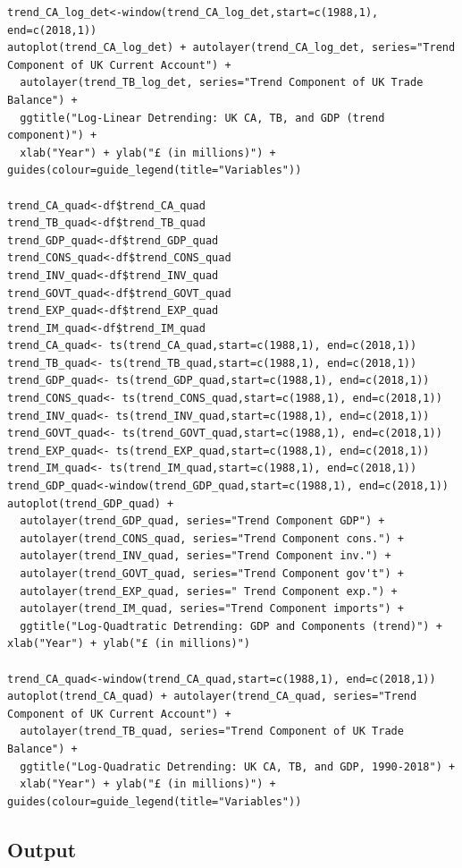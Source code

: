 \documentclass[12pt]{article}
\begin{document}
\begin{verbatim}
trend_CA_log_det<-window(trend_CA_log_det,start=c(1988,1), end=c(2018,1)) 
autoplot(trend_CA_log_det) + autolayer(trend_CA_log_det, series="Trend Component of UK Current Account") +
  autolayer(trend_TB_log_det, series="Trend Component of UK Trade Balance") +
  ggtitle("Log-Linear Detrending: UK CA, TB, and GDP (trend component)") + 
  xlab("Year") + ylab("£ (in millions)") + guides(colour=guide_legend(title="Variables"))

trend_CA_quad<-df$trend_CA_quad
trend_TB_quad<-df$trend_TB_quad
trend_GDP_quad<-df$trend_GDP_quad
trend_CONS_quad<-df$trend_CONS_quad
trend_INV_quad<-df$trend_INV_quad
trend_GOVT_quad<-df$trend_GOVT_quad
trend_EXP_quad<-df$trend_EXP_quad	
trend_IM_quad<-df$trend_IM_quad
trend_CA_quad<- ts(trend_CA_quad,start=c(1988,1), end=c(2018,1))
trend_TB_quad<- ts(trend_TB_quad,start=c(1988,1), end=c(2018,1))
trend_GDP_quad<- ts(trend_GDP_quad,start=c(1988,1), end=c(2018,1))
trend_CONS_quad<- ts(trend_CONS_quad,start=c(1988,1), end=c(2018,1))
trend_INV_quad<- ts(trend_INV_quad,start=c(1988,1), end=c(2018,1))
trend_GOVT_quad<- ts(trend_GOVT_quad,start=c(1988,1), end=c(2018,1))
trend_EXP_quad<- ts(trend_EXP_quad,start=c(1988,1), end=c(2018,1))
trend_IM_quad<- ts(trend_IM_quad,start=c(1988,1), end=c(2018,1))
trend_GDP_quad<-window(trend_GDP_quad,start=c(1988,1), end=c(2018,1)) 
autoplot(trend_GDP_quad) +
  autolayer(trend_GDP_quad, series="Trend Component GDP") +
  autolayer(trend_CONS_quad, series="Trend Component cons.") +
  autolayer(trend_INV_quad, series="Trend Component inv.") +
  autolayer(trend_GOVT_quad, series="Trend Component gov't") +
  autolayer(trend_EXP_quad, series=" Trend Component exp.") +
  autolayer(trend_IM_quad, series="Trend Component imports") +
  ggtitle("Log-Quadtratic Detrending: GDP and Components (trend)") + xlab("Year") + ylab("£ (in millions)")

trend_CA_quad<-window(trend_CA_quad,start=c(1988,1), end=c(2018,1)) 
autoplot(trend_CA_quad) + autolayer(trend_CA_quad, series="Trend Component of UK Current Account") +
  autolayer(trend_TB_quad, series="Trend Component of UK Trade Balance") +
  ggtitle("Log-Quadratic Detrending: UK CA, TB, and GDP, 1990-2018") + 
  xlab("Year") + ylab("£ (in millions)") + guides(colour=guide_legend(title="Variables"))

\end{verbatim}

\subsection{Output}
\end{document}
